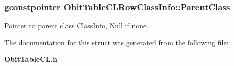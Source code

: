 \subsubsection{\setlength{\rightskip}{0pt plus 5cm}gconstpointer {\bf Obit\-Table\-CLRow\-Class\-Info::Parent\-Class}}\label{structObitTableCLRowClassInfo_o3}


Pointer to parent class Class\-Info, Null if none. 



The documentation for this struct was generated from the following file:\begin{CompactItemize}
\item 
{\bf Obit\-Table\-CL.h}\end{CompactItemize}
